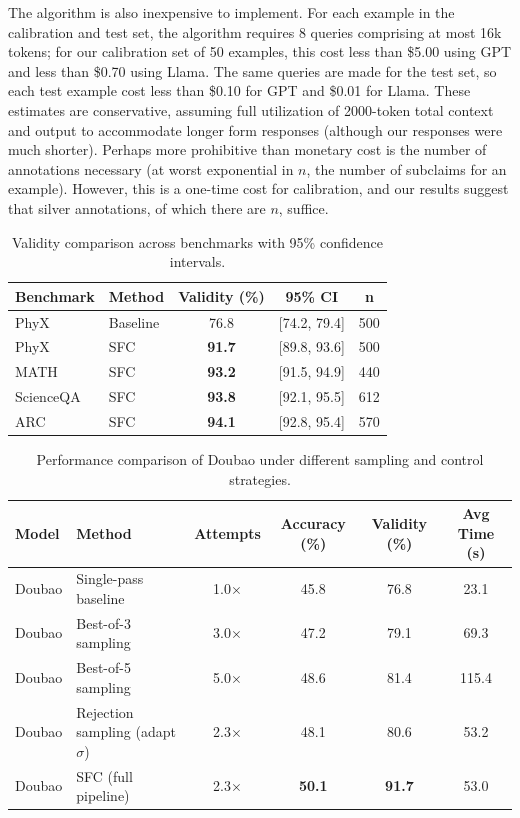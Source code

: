 \documentclass{uai2026} %
\theoremstyle{remark}
\theoremstyle{plain}
\theoremstyle{definition}
\begin{document}
The algorithm is also inexpensive to implement. For each example in the calibration and test set, the algorithm requires 8 queries comprising at most 16k tokens; for our calibration set of 50 examples, this cost less than \$5.00 using GPT and less than \$0.70 using Llama. The same queries are made for the test set, so each test example cost less than \$0.10 for GPT and \$0.01 for Llama. These estimates are conservative, assuming full utilization of 2000-token total context and output to accommodate longer form responses (although our responses were much shorter). Perhaps more prohibitive than monetary cost is the number of annotations necessary (at worst exponential in $n$, the number of subclaims for an example). However, this is a one-time cost for calibration, and our results suggest that silver annotations, of which there are $n$, suffice.
\begin{table}[ht]
\centering


\caption{Validity comparison across benchmarks with 95\% confidence intervals.}
\label{tab:validity_ci}
\small
\begin{tabular}{l|l|c|c|c}
\hline
\textbf{Benchmark} & \textbf{Method} & \textbf{Validity (\%)} & \textbf{95\% CI} & \textbf{n} \\
\hline
PhyX & Baseline & 76.8 & [74.2, 79.4] & 500 \\
PhyX & SFC & \textbf{91.7} & [89.8, 93.6] & 500 \\
MATH & SFC & \textbf{93.2} & [91.5, 94.9] & 440 \\
ScienceQA & SFC & \textbf{93.8} & [92.1, 95.5] & 612 \\
ARC & SFC & \textbf{94.1} & [92.8, 95.4] & 570 \\
\hline
\end{tabular}
\end{table}
\begin{table}[ht]
\centering
\caption{Performance comparison of Doubao under different sampling and control strategies.}
\label{tab:doubao_results}
\begin{tabular}{l|l|c|c|c|c}
\hline
\textbf{Model} & \textbf{Method} & \textbf{Attempts} & \textbf{Accuracy (\%)} & \textbf{Validity (\%)} & \textbf{Avg Time (s)} \\
\hline
Doubao & Single-pass baseline & 1.0$\times$ & 45.8 & 76.8 & 23.1 \\
Doubao & Best-of-3 sampling & 3.0$\times$ & 47.2 & 79.1 & 69.3 \\
Doubao & Best-of-5 sampling & 5.0$\times$ & 48.6 & 81.4 & 115.4 \\
Doubao & Rejection sampling (adapt $\sigma$) & 2.3$\times$ & 48.1 & 80.6 & 53.2 \\
Doubao & SFC (full pipeline) & 2.3$\times$ & \textbf{50.1} & \textbf{91.7} & 53.0 \\
\hline
\end{tabular}
\end{table}
\end{document}
